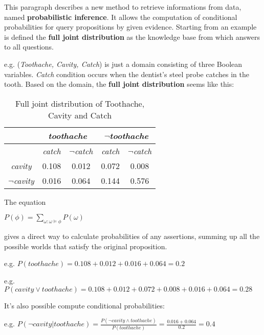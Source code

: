 This paragraph describes a new method to retrieve informations from data, named \textbf{probabilistic inference}.
It allows the computation of conditional probabilities for query propositions by given evidence.
Starting from an example is defined the \textbf{full joint distribution} as the knowledge base from which answers to all questions.
\begin{example}
  e.g. (\textit{Toothache, Cavity, Catch}) is just a domain consisting of three Boolean variables. \textit{Catch} condition occurs when the dentist's steel probe catches in the tooth. Based on the domain, the \textbf{full joint distribution} seems like this:
  \begin{center}
        \begin{table}[H]
            \centering
            \begin{tabular}{|c|c|c|c|c|}
                \hline
                \multicolumn{1}{|c|}{} & \multicolumn{2}{|c|}{\it toothache} & \multicolumn{2}{|c|}{\it $\neg$toothache} \\
                \hline
                \it & \it catch & \it $\neg$catch & \it catch & \it $\neg$catch \\
                \it cavity & 0.108 & 0.012 & 0.072 & 0.008 \\
                \it $\neg$cavity & 0.016 & 0.064 & 0.144 & 0.576 \\
                \hline
            \end{tabular}
            \caption{Full joint distribution of Toothache, Cavity and Catch}
            \label{t_1_2}
        \end{table}
    \end{center}
    The equation 
    \begin{center}
        $P(\phi) = \sum_{\omega:\omega\models\phi}P(\omega)$
    \end{center}
    gives a direct way to calculate probabilities of any assertions, summing up all the possible worlds that satisfy the original proposition. \vspace{3.5pt}

    e.g. $P(toothache) = 0.108 + 0.012 + 0.016 + 0.064 = 0.2$ 

    e.g. $P(cavity \vee toothache) = 0.108 + 0.012 + 0.072 + 0.008 + 0.016 + 0.064 = 0.28$

    It's also possible compute conditional probabilities: \vspace*{3.5pt}

    e.g. $P(\neg cavity|toothache) = \frac{P(\neg cavity \land toothache)}{P(toothache)} = \frac{0.016 + 0.064}{0.2} = 0.4$ \vspace{3.5pt}


\end{example}
